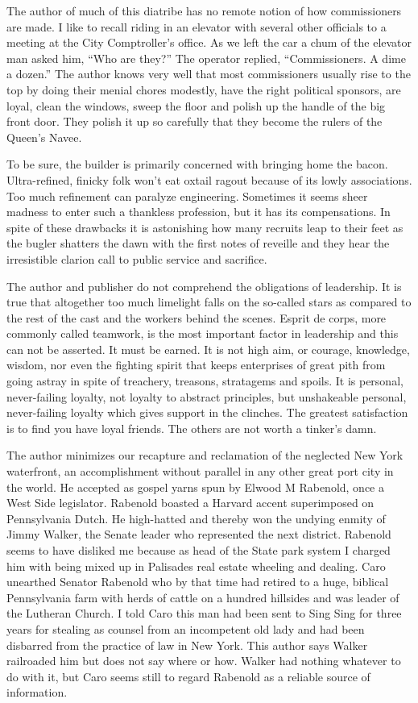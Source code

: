 \documentclass[11pt,letterpaper]{article}
\begin{document}
The author of much of this diatribe has no remote notion of how commissioners are made. I like to recall riding in an elevator with several other officials to a meeting at the City Comptroller's office. As we left the car a chum of the elevator man asked him, \enquote{Who are they?} The operator replied, \enquote{Commissioners. A dime a dozen.} The author knows very well that most commissioners usually rise to the top by doing their menial chores modestly, have the right political sponsors, are loyal, clean the windows, sweep the floor and polish up the handle of the big front door. They polish it up so carefully that they become the rulers of the Queen's Navee.

To be sure, the builder is primarily concerned with bringing home the bacon. Ultra-refined, finicky folk won't eat oxtail ragout because of its lowly associations. Too much refinement can paralyze engineering. Sometimes it seems sheer madness to enter such a thankless profession, but it has its compensations. In spite of these drawbacks it is astonishing how many recruits leap to their feet as the bugler shatters the dawn with the first notes of reveille and they hear the irresistible clarion call to public service and sacrifice.

The author and publisher do not comprehend the obligations of leadership. It is true that altogether too much limelight falls on the so-called stars as compared to the rest of the cast and the workers behind the scenes. Esprit de corps, more commonly called teamwork, is the most important factor in leadership and this can not be asserted. It must be earned. It is not high aim, or courage, knowledge, wisdom, nor even the fighting spirit that keeps enterprises of great pith from going astray in spite of treachery, treasons, stratagems and spoils. It is personal, never-failing loyalty, not loyalty to abstract principles, but unshakeable personal, never-failing loyalty which gives support in the clinches. The greatest satisfaction is to find you have loyal friends. The others are not worth a tinker's damn.

The author minimizes our recapture and reclamation of the neglected New York waterfront, an accomplishment without parallel in any other great port city in the world. He accepted as gospel yarns spun by Elwood M Rabenold, once a West Side legislator. Rabenold boasted a Harvard accent superimposed on Pennsylvania Dutch. He high-hatted and thereby won the undying enmity of Jimmy Walker, the Senate leader who represented the next district. Rabenold seems to have disliked me because as head of the State park system I charged him with being mixed up in Palisades real estate wheeling and dealing. Caro unearthed Senator Rabenold who by that time had retired to a huge, biblical Pennsylvania farm with herds of cattle on a hundred hillsides and was leader of the Lutheran Church. I told Caro this man had been sent to Sing Sing for three years for stealing as counsel from an incompetent old lady and had been disbarred from the practice of law in New York. This author says Walker railroaded him but does not say where or how. Walker had nothing whatever to do with it, but Caro seems still to regard Rabenold as a reliable source of information.
\end{document}
